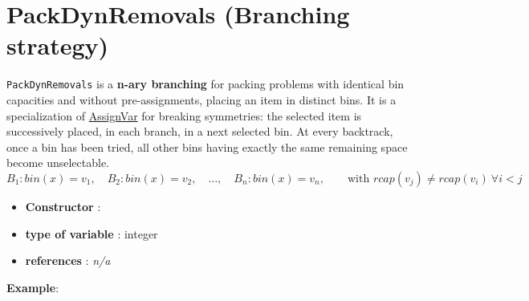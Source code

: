\section{PackDynRemovals (Branching strategy)}\label{packdynremovals:packdynremovalsbranchstrat}\hypertarget{packdynremovals:packdynremovalsbranchstrat}{}
\begin{notedef}
  \texttt{PackDynRemovals} is a \textbf{n-ary branching} for packing problems with identical bin capacities and without pre-assignments, placing an item in distinct bins. It is a specialization of \hyperlink{assignvar:assignvarbranchstrat}{AssignVar} for breaking symmetries: 
the selected item is successively placed, in each branch, in a next selected bin. At every backtrack, once a bin has been tried, all other bins having exactly the same remaining space become unselectable.
$$B_1: bin(x)=v_1,\quad B_2: bin(x)=v_2,\quad \ldots,\quad B_n: bin(x)=v_n,\qquad\text{with } rcap(v_j)\neq rcap(v_i)\ \forall i<j$$
\end{notedef}

\begin{itemize}
	\item \textbf{Constructor} :
	\item \textbf{type of variable} : integer
	\item \textbf{references} : \emph{n/a}
\end{itemize}

\textbf{Example}:
%

